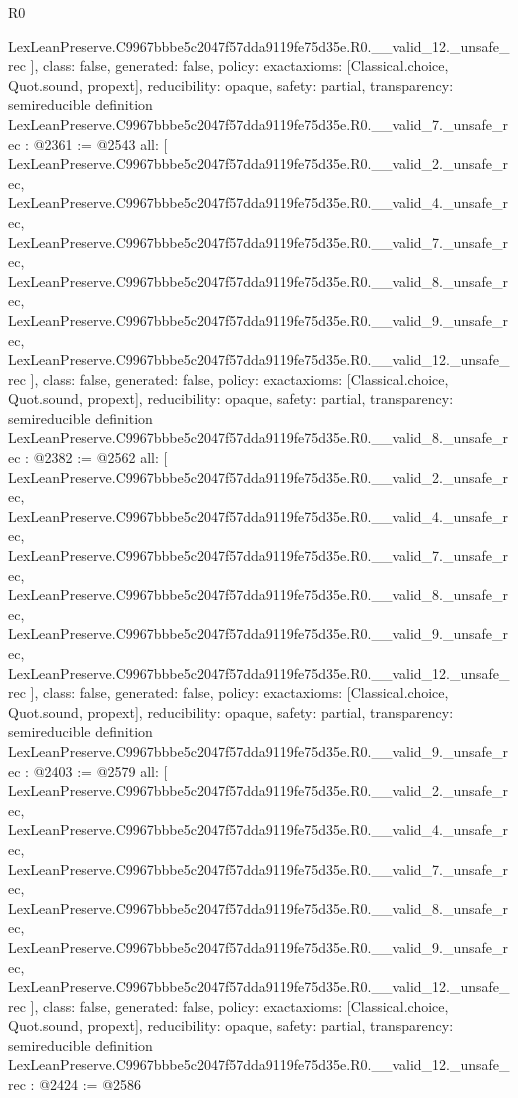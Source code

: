 \begin{lexlean}{R0}
\begin{coremodule}
{    LexLeanPreserve.C9967bbbe5c2047f57dda9119fe75d35e.R0.__valid_12._unsafe_rec
  ],
  class: false,
  generated: false,
  policy: exact{axioms: [Classical.choice, Quot.sound, propext]},
  reducibility: opaque{},
  safety: partial,
  transparency: semireducible
}
definition LexLeanPreserve.C9967bbbe5c2047f57dda9119fe75d35e.R0.__valid_7._unsafe_rec : @2361 := @2543 {
  all: [
    LexLeanPreserve.C9967bbbe5c2047f57dda9119fe75d35e.R0.__valid_2._unsafe_rec,
    LexLeanPreserve.C9967bbbe5c2047f57dda9119fe75d35e.R0.__valid_4._unsafe_rec,
    LexLeanPreserve.C9967bbbe5c2047f57dda9119fe75d35e.R0.__valid_7._unsafe_rec,
    LexLeanPreserve.C9967bbbe5c2047f57dda9119fe75d35e.R0.__valid_8._unsafe_rec,
    LexLeanPreserve.C9967bbbe5c2047f57dda9119fe75d35e.R0.__valid_9._unsafe_rec,
    LexLeanPreserve.C9967bbbe5c2047f57dda9119fe75d35e.R0.__valid_12._unsafe_rec
  ],
  class: false,
  generated: false,
  policy: exact{axioms: [Classical.choice, Quot.sound, propext]},
  reducibility: opaque{},
  safety: partial,
  transparency: semireducible
}
definition LexLeanPreserve.C9967bbbe5c2047f57dda9119fe75d35e.R0.__valid_8._unsafe_rec : @2382 := @2562 {
  all: [
    LexLeanPreserve.C9967bbbe5c2047f57dda9119fe75d35e.R0.__valid_2._unsafe_rec,
    LexLeanPreserve.C9967bbbe5c2047f57dda9119fe75d35e.R0.__valid_4._unsafe_rec,
    LexLeanPreserve.C9967bbbe5c2047f57dda9119fe75d35e.R0.__valid_7._unsafe_rec,
    LexLeanPreserve.C9967bbbe5c2047f57dda9119fe75d35e.R0.__valid_8._unsafe_rec,
    LexLeanPreserve.C9967bbbe5c2047f57dda9119fe75d35e.R0.__valid_9._unsafe_rec,
    LexLeanPreserve.C9967bbbe5c2047f57dda9119fe75d35e.R0.__valid_12._unsafe_rec
  ],
  class: false,
  generated: false,
  policy: exact{axioms: [Classical.choice, Quot.sound, propext]},
  reducibility: opaque{},
  safety: partial,
  transparency: semireducible
}
definition LexLeanPreserve.C9967bbbe5c2047f57dda9119fe75d35e.R0.__valid_9._unsafe_rec : @2403 := @2579 {
  all: [
    LexLeanPreserve.C9967bbbe5c2047f57dda9119fe75d35e.R0.__valid_2._unsafe_rec,
    LexLeanPreserve.C9967bbbe5c2047f57dda9119fe75d35e.R0.__valid_4._unsafe_rec,
    LexLeanPreserve.C9967bbbe5c2047f57dda9119fe75d35e.R0.__valid_7._unsafe_rec,
    LexLeanPreserve.C9967bbbe5c2047f57dda9119fe75d35e.R0.__valid_8._unsafe_rec,
    LexLeanPreserve.C9967bbbe5c2047f57dda9119fe75d35e.R0.__valid_9._unsafe_rec,
    LexLeanPreserve.C9967bbbe5c2047f57dda9119fe75d35e.R0.__valid_12._unsafe_rec
  ],
  class: false,
  generated: false,
  policy: exact{axioms: [Classical.choice, Quot.sound, propext]},
  reducibility: opaque{},
  safety: partial,
  transparency: semireducible
}
definition LexLeanPreserve.C9967bbbe5c2047f57dda9119fe75d35e.R0.__valid_12._unsafe_rec : @2424 := @2586 {
}
\end{coremodule}
\end{lexlean}
